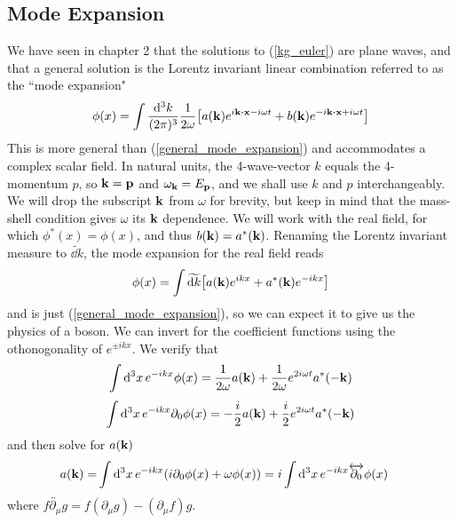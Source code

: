 \subsection{Mode Expansion}
We have seen in chapter 2 that the solutions to (\ref{kg_euler}) are plane waves, and that a general solution is the Lorentz invariant linear combination referred to as the ``mode expansion"
\begin{equation}
    \phi(x)=\int \frac{\dd^3k}{(2\pi)^3}\frac{1}{2\omega}\qty[a(\vb{k})e^{i\vb{k}\vdot\vb{x}-i\omega t}+b(\vb{k})e^{-i\vb{k}\vdot\vb{x}+i\omega t}]
\end{equation}
This is more general than (\ref{general_mode_expansion}) and accommodates a complex scalar field.
In natural units, the 4-wave-vector $k$ equals the 4-momentum $p$, so $\vb{k}=\vb{p}$ and $\omega_{\vb{k}}=E_{\vb{p}}$, and we shall use $k$ and $p$ interchangeably. We will drop the subscript $\vb{k}$ from $\omega$ for brevity, but keep in mind that the mass-shell condition gives $\omega$ its $\vb{k}$ dependence. 
We will work with the real field, for which $\phi^*(x)=\phi(x)$, and thus $b(\vb{k})=a^*(\vb{k})$. Renaming the Lorentz invariant measure to $\widetilde{\dd k}$, the mode expansion for the real field reads
\begin{equation}
    \phi(x)=\int \widetilde{\dd k}\qty[a(\vb{k})e^{ikx}+a^*(\vb{k})e^{-ikx}]
    \label{mode_expansion}
\end{equation}
and is just (\ref{general_mode_expansion}), so we can expect it to give us the physics of a boson. We can invert for the coefficient functions using the othonogonality of $e^{\pm ikx}$. We verify that
\begin{equation}
    \int\dd^3x\,e^{-ikx}\phi(x)=\frac{1}{2\omega}a(\vb{k})+\frac{1}{2\omega}e^{2i\omega t}a^*(-\vb{k})
\end{equation}
\begin{equation}
    \int\dd^3x\,e^{-ikx}\partial_0\phi(x)=-\frac{i}{2}a(\vb{k})+\frac{i}{2}e^{2i\omega t}a^*(-\vb{k})
\end{equation}
and then solve for $a(\vb{k})$
\begin{equation}
\begin{aligned}
        a(\vb{k})=&\int\dd^3x\,e^{-ikx}\qty(i\partial_0\phi(x)+\omega\phi(x))=i\int\dd^3x\,e^{-ikx}\overleftrightarrow{\partial_0}\phi(x)
\end{aligned}
\end{equation}
where $f\overleftrightarrow{\partial_\mu}g=f(\partial_\mu g)-    (\partial_\mu f)g$.
